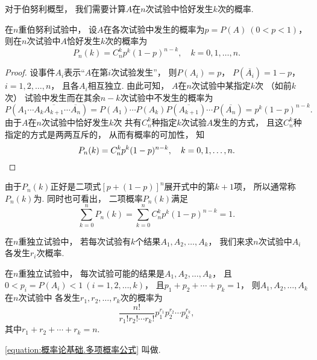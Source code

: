 对于伯努利概型，
我们需要计算\(A\)在\(n\)次试验中恰好发生\(k\)次的概率.

\begin{theorem}[二项概率]
在\(n\)重伯努利试验中，
设\(A\)在各次试验中发生的概率为\(p = P(A)\ (0 < p < 1)\)，
则在\(n\)次试验中\(A\)恰好发生\(k\)次的概率为\begin{equation}
	P_n(k) = C_n^k p^k (1-p)^{n-k}, \quad k=0,1,\dotsc,n.
\end{equation}
\begin{proof}
设事件\(A_i\)表示“\(A\)在第\(i\)次试验发生”，
则\(P(A_i)=p\)，
\(P(\overline{A_i})=1-p\)，
\(i=1,2,\dotsc,n\)，
且各\(A_i\)相互独立.
由此可知，
\(A\)在\(n\)次试验中某指定\(k\)次
（如前\(k\)次）
试验中发生而在其余\(n-k\)次试验中不发生的概率为\[
	P(A_1 \dotsm A_k \overline{A_{k+1}} \dotsm \overline{A_n})
	= P(A_1) \dotsm P(A_k) P(\overline{A_{k+1}}) \dotsm P(\overline{A_n})
	= p^k (1-p)^{n-k}.
\]
由于\(A\)在\(n\)次试验中恰好发生\(k\)次
共有\(C_n^k\)种指定\(k\)次试验\(A\)发生的方式，
且这\(C_n^k\)种指定的方式是两两互斥的，
从而有概率的可加性，
知\[
	P_n(k) = C_n^k p^k (1-p)^{n-k},
	\quad k=0,1,\dotsc,n.
	\qedhere
\]
\end{proof}
\end{theorem}
由于\(P_n(k)\)正好是二项式\([p+(1-p)]^n\)展开式中的第\(k+1\)项，
所以通常称\(P_n(k)\)为.
同时也可看出，
二项概率\(P_n(k)\)满足\begin{equation}
	\sum_{k=0}^n P_n(k)
	= \sum_{k=0}^n C_n^k p^k (1-p)^{n-k} = 1.
\end{equation}

在\(n\)重独立试验中，
若每次试验有\(k\)个结果\(A_1,A_2,\dotsc,A_k\)，
我们来求\(n\)次试验中\(A_i\)各发生\(r_i\)次概率.

\begin{theorem}[多项概率]
在\(n\)重独立试验中，
每次试验可能的结果是\(A_1,A_2,\dotsc,A_k\)，
且\(0 < p_i = P(A_i) < 1\ (i=1,2,\dotsc,k)\)，
且\(p_1+p_2+\dotsb+p_k=1\)，
则\(A_1,A_2,\dotsc,A_k\)在\(n\)次试验中
各发生\(r_1,r_2,\dotsc,r_k\)次的概率为
\begin{equation}\label{equation:概率论基础.多项概率公式}
	\frac{n!}{r_1! r_2! \dotsm r_k!}
	p_1^{r_1} p_2^{r_2} \dotsm p_k^{r_k},
\end{equation}
其中\(r_1+r_2+\dotsb+r_k=n\).
\end{theorem}
\cref{equation:概率论基础.多项概率公式}
叫做.
